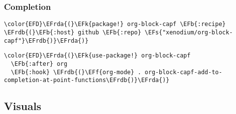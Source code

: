 \documentclass[12pt]{article}
\theoremstyle{plain}%
\theoremstyle{definition}
\theoremstyle{remark}
\newcommand{\EFs}[1]{\textcolor{EFs}{#1}} %
\newcommand{\EFk}[1]{\textcolor{EFk}{#1}} %
\newcommand{\EFb}[1]{\textcolor{EFb}{#1}} %
\newcommand{\EFf}[1]{\textcolor{EFf}{#1}} %
\newcommand{\EFrda}[1]{\textcolor{EFrda}{#1}} %
\newcommand{\EFrdb}[1]{\textcolor{EFrdb}{#1}} %
\begin{document}
\subsubsection{Completion}
\label{sec:org23ff38c}
\begin{Code}
\begin{Verbatim}
\color{EFD}\EFrda{(}\EFk{package!} org-block-capf \EFb{:recipe} \EFrdb{(}\EFb{:host} github \EFb{:repo} \EFs{"xenodium/org-block-capf"}\EFrdb{)}\EFrda{)}
\end{Verbatim}
\end{Code}
\begin{Code}
\begin{Verbatim}
\color{EFD}\EFrda{(}\EFk{use-package!} org-block-capf
  \EFb{:after} org
  \EFb{:hook} \EFrdb{(}\EFf{org-mode} . org-block-capf-add-to-completion-at-point-functions\EFrdb{)}\EFrda{)}
\end{Verbatim}
\end{Code}
\subsection{Visuals}
\label{sec:org6f23179}
\end{document}
